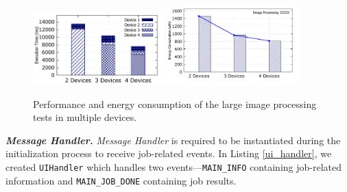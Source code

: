 \documentclass{sig-alternate}
\begin{document}

\begin{figure} [!tbh]
\noindent {}	
  \label{code:get_single_part}
\end{figure}



\begin{figure} 
	\centering
		\includegraphics[width=0.45\textwidth]{data/img_perf.pdf}		
		\includegraphics[width=0.45\textwidth]{data/img_energy.pdf}
	\caption{Performance and energy consumption of the large image processing tests in multiple devices.}
	\label{fig:cluster_performance}
\end{figure}

\textbf{\emph{Message Handler.}} \emph{Message Handler} is required to be instantiated during the initialization process to receive job-related events. In Listing \ref{ui_handler}, we created \texttt{UIHandler} which handles two events---\texttt{MAIN\_INFO} containing job-related information and \texttt{MAIN\_JOB\_DONE} containing job results. 
\end{document}
